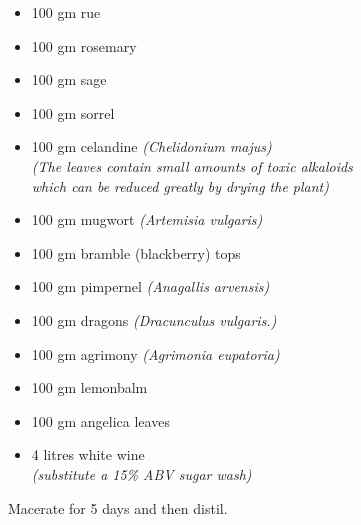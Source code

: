 \documentclass{article}
\begin{document}
\begin{textblock}{11}
    \vspace{-\topsep}
    \begin{itemize}
        \renewcommand{\labelitemi}{$\circ$}
        \item 100 gm rue
        \item 100 gm rosemary
        \item 100 gm sage
        \item 100 gm sorrel
        \item 100 gm celandine \emph{(Chelidonium majus)\\
            [0.4\baselineskip]
            (The leaves contain small amounts of toxic alkaloids\\
            which can be reduced greatly by drying the plant)}
        \item 100 gm mugwort \emph{(Artemisia vulgaris)}
        \item 100 gm bramble (blackberry) tops
        \item 100 gm pimpernel \emph{(Anagallis arvensis)}
        \item 100 gm dragons \emph{(Dracunculus vulgaris.)}
        \item 100 gm agrimony \emph{(Agrimonia eupatoria)}
        \item 100 gm lemonbalm
        \item 100 gm angelica leaves
        \item 4 litres white wine\\
            [0.4\baselineskip]
            \emph{(substitute a 15\% ABV sugar wash)}
    \end{itemize}
    \vspace{-\topsep}

    Macerate for 5 days and then distil.

\end{textblock}
\end{document}
